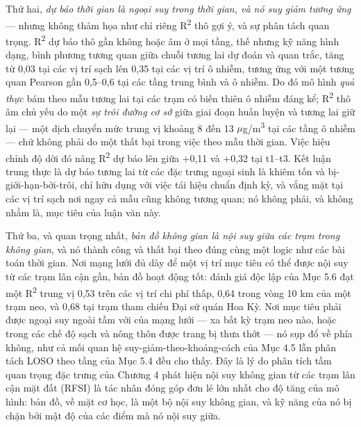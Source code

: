 Thứ hai, \emph{dự báo thời gian là ngoại suy trong thời gian, và nó suy giảm tương ứng} --- nhưng không thảm họa như chỉ riêng R\textsuperscript{2} thô gợi ý, và sự phân tách quan trọng. R\textsuperscript{2} dự báo thô gần không hoặc âm ở mọi tầng, thế nhưng kỹ năng hình dạng, bình phương tương quan giữa chuỗi tương lai dự đoán và quan trắc, tăng từ 0,03 tại các vị trí sạch lên 0,35 tại các vị trí ô nhiễm, tương ứng với một tương quan Pearson gần 0,5--0,6 tại các tầng trung bình và ô nhiễm. Do đó mô hình \emph{quả thực} bám theo mẫu tương lai tại các trạm có biến thiên ô nhiễm đáng kể; R\textsuperscript{2} thô âm chủ yếu do một \emph{sự trôi đường cơ sở} giữa giai đoạn huấn luyện và tương lai giữ lại --- một dịch chuyển mức trung vị khoảng 8 đến 13 $\mu$g/m\textsuperscript{3} tại các tầng ô nhiễm --- chứ không phải do một thất bại trong việc theo mẫu thời gian. Việc hiệu chỉnh độ dời đó nâng R\textsuperscript{2} dự báo lên giữa +0,11 và +0,32 tại t1--t3. Kết luận trung thực là dự báo tương lai từ các đặc trưng ngoại sinh là khiêm tốn và bị-giới-hạn-bởi-trôi, chỉ hữu dụng với việc tái hiệu chuẩn định kỳ, và vắng mặt tại các vị trí sạch nơi ngay cả mẫu cũng không tương quan; nó không phải, và không nhằm là, mục tiêu của luận văn này.

Thứ ba, và quan trọng nhất, \emph{bản đồ không gian là nội suy giữa các trạm trong không gian}, và nó thành công và thất bại theo đúng cùng một logic như các bài toán thời gian. Nơi mạng lưới đủ dày để một vị trí mục tiêu có thể được nội suy từ các trạm lân cận gần, bản đồ hoạt động tốt: đánh giá độc lập của Mục 5.6 đạt một R\textsuperscript{2} trung vị 0,53 trên các vị trí chi phí thấp, 0,64 trong vòng 10 km của một trạm neo, và 0,68 tại trạm tham chiếu Đại sứ quán Hoa Kỳ. Nơi mục tiêu phải được ngoại suy ngoài tầm với của mạng lưới --- xa bất kỳ trạm neo nào, hoặc trong các chế độ sạch và nông thôn được trang bị thưa thớt --- nó sụp đổ về phía không, như cả mối quan hệ suy-giảm-theo-khoảng-cách của Mục 4.5 lẫn phân tách LOSO theo tầng của Mục 5.4 đều cho thấy. Đây là lý do phân tích tầm quan trọng đặc trưng của Chương 4 phát hiện nội suy không gian từ các trạm lân cận mặt đất (RFSI) là tác nhân đóng góp đơn lẻ lớn nhất cho độ tăng của mô hình: bản đồ, về mặt cơ học, là một bộ nội suy không gian, và kỹ năng của nó bị chặn bởi mật độ của các điểm mà nó nội suy giữa.


